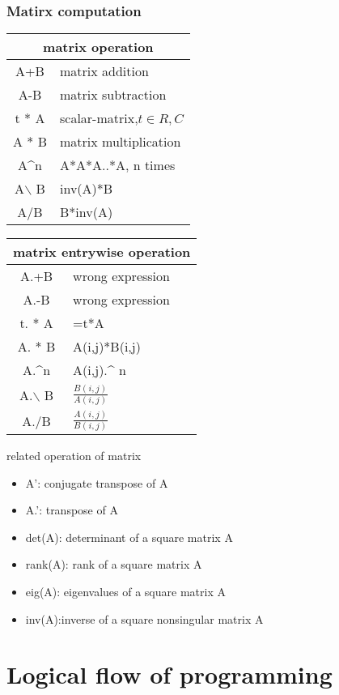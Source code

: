 \documentclass[aspectratio=169]{beamer}
\begin{document}
 \begin{frame}
   \frametitle{Matirx computation}
   \small
   
   \begin{tabularx}{0.48\linewidth}{cX}\toprule
     \multicolumn{2}{c}{matrix  operation}\\\midrule
     A+B &matrix addition\\\midrule
A-B &matrix subtraction\\\midrule
t * A& scalar-matrix,$t\in R,C$\\\midrule
A * B& matrix multiplication\\\midrule
A\^{}n & A*A*A..*A, n times\\\midrule
A$\backslash$ B & inv(A)*B\\\midrule
A/B& B*inv(A)\\\bottomrule
\end{tabularx}
\begin{tabularx}{0.48\linewidth}{cX}\toprule
       \multicolumn{2}{c}{matrix  entrywise operation}\\\midrule
     A.+B &wrong expression\\\midrule
A.-B &wrong expression\\\midrule
t. * A&=t*A\\\midrule
A. * B& A(i,j)*B(i,j)\\\midrule
A.\^{}n & A(i,j).\^{} n\\\midrule
A.$\backslash$ B &$\frac{B(i,j)}{A(i,j)}$\\\midrule
A./B& $\frac{A(i,j)}{B(i,j)}$\\\bottomrule
   \end{tabularx}
 \end{frame}
 \begin{frame}{related operation of matrix}
   \begin{itemize}
     \item A’: conjugate transpose of A
           \item A.': transpose of A
     \item det(A): determinant of a square matrix A
     \item rank(A): rank of a square matrix A
     \item eig(A): eigenvalues of a square matrix A
     \item inv(A):inverse of a square nonsingular matrix A
   \end{itemize}
 \end{frame}
 \section{Logical flow of programming}
 
\end{document}
